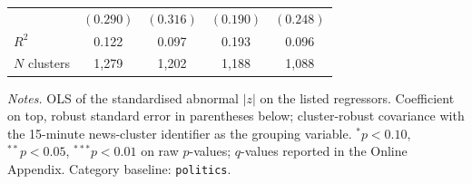\begin{table}[!htbp]
\begin{threeparttable}
\begin{tabular}{lcccc}
 & $(0.290)$ & $(0.316)$ & $(0.190)$ & $(0.248)$ \\
\addlinespace[2pt]
\midrule
$R^2$ & 0.122 & 0.097 & 0.193 & 0.096 \\
$N$ clusters & 1,279 & 1,202 & 1,188 & 1,088 \\
\bottomrule
\end{tabular}
\begin{tablenotes}
\footnotesize
\item \textit{Notes.} OLS of the standardised abnormal $|z|$ on the
listed regressors. Coefficient on top, robust standard error in
parentheses below; cluster-robust covariance with the 15-minute
news-cluster identifier as the grouping variable.
$^{*}p<0.10$, $^{**}p<0.05$, $^{***}p<0.01$ on raw $p$-values;
$q$-values reported in the Online Appendix. Category baseline:
\texttt{politics}.
\end{tablenotes}
\end{threeparttable}
\end{table}

